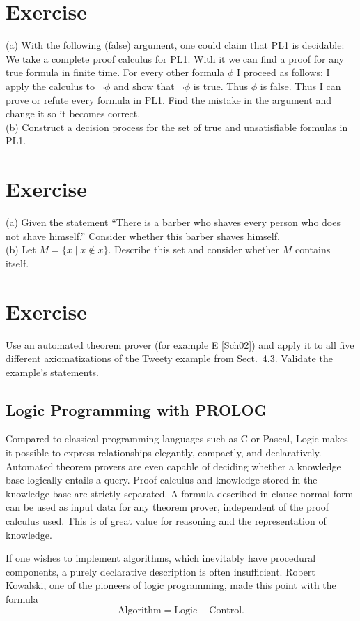 \documentclass[10pt]{book}
\begin{document}
\section{Exercise}
(a) With the following (false) argument, one could claim that PL1 is decidable: We take a complete proof calculus for PL1. With it we can find a proof for any true formula in finite time. For every other formula $\phi$ I proceed as follows: I apply the calculus to $\neg \phi$ and show that $\neg \phi$ is true. Thus $\phi$ is false. Thus I can prove or refute every formula in PL1. Find the mistake in the argument and change it so it becomes correct.\\
(b) Construct a decision process for the set of true and unsatisfiable formulas in PL1.

\section{Exercise}
(a) Given the statement ``There is a barber who shaves every person who does not shave himself.'' Consider whether this barber shaves himself.\\
(b) Let $M=\{x \mid x \notin x\}$. Describe this set and consider whether $M$ contains itself.

\section{Exercise}
Use an automated theorem prover (for example E [Sch02]) and apply it to all five different axiomatizations of the Tweety example from Sect.\ 4.3. Validate the example's statements.
\subsection{Logic Programming with PROLOG}

Compared to classical programming languages such as C or Pascal, Logic makes it possible to express relationships elegantly, compactly, and declaratively. Automated theorem provers are even capable of deciding whether a knowledge base logically entails a query. Proof calculus and knowledge stored in the knowledge base are strictly separated. A formula described in clause normal form can be used as input data for any theorem prover, independent of the proof calculus used. This is of great value for reasoning and the representation of knowledge.

If one wishes to implement algorithms, which inevitably have procedural components, a purely declarative description is often insufficient. Robert Kowalski, one of the pioneers of logic programming, made this point with the formula
\[
\text{Algorithm} = \text{Logic} + \text{Control}.
\]
\end{document}
